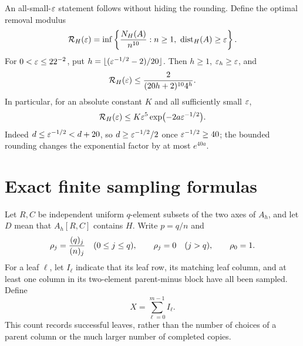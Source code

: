 An all-small-\(\varepsilon\) statement follows without hiding the rounding.
Define the optimal removal modulus
\[
 \mathcal R_H(\varepsilon)=\inf\left\{
  \frac{N_H(A)}{n^{10}}: n\ge1,\ \operatorname{dist}_H(A)\ge\varepsilon\right\}.
\]
For \(0<\varepsilon\le22^{-2}\), put
\(h=\lfloor(\varepsilon^{-1/2}-2)/20\rfloor\). Then \(h\ge1\),
\(\varepsilon_h\ge\varepsilon\), and
\begin{equation}
 \mathcal R_H(\varepsilon)
 \le \frac{2}{(20h+2)^{10}4^h}.
 \label{eq:all-epsilon}
\end{equation}
In particular, for an absolute constant \(K\) and all sufficiently
small \(\varepsilon\),
\[
 \mathcal R_H(\varepsilon)
 \le K\varepsilon^5\exp\bigl(-2a\varepsilon^{-1/2}\bigr).
\]
Indeed \(d\le\varepsilon^{-1/2}<d+20\), so \(d\ge\varepsilon^{-1/2}/2\) once
\(\varepsilon^{-1/2}\ge40\); the bounded rounding changes the exponential
factor by at most \(e^{40a}\).

\section{Exact finite sampling formulas}
\label{sec:finite-sampling}

Let \(R,C\) be independent uniform \(q\)-element subsets of the two
axes of \(A_h\), and let \(D\) mean that \(A_h[R,C]\) contains \(H\).
Write \(p=q/n\) and
\[
 \rho_j=\frac{(q)_{j}}{(n)_{j}}\quad(0\le j\le q),
 \qquad \rho_j=0\quad(j>q),
 \qquad \rho_0=1.
\]
For a leaf \(\ell\), let \(I_\ell\) indicate that its leaf row, its
matching leaf column, and at least one column in its two-element
parent-minus block have all been sampled. Define
\begin{equation}
 X=\sum_{\ell=0}^{m-1}I_\ell.
 \label{eq:X}
\end{equation}
This count records successful leaves, rather than the number of choices
of a parent column or the much larger number of completed copies.

